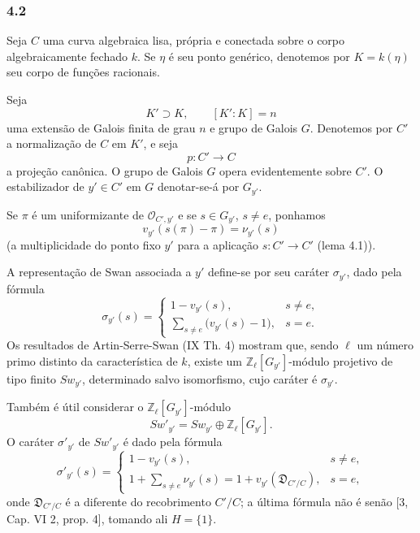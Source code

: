 \subsubsection*{4.2}

Seja $C$ uma curva algebraica lisa, própria e conectada sobre o corpo algebraicamente fechado $k$. Se $\eta$ é seu ponto genérico, denotemos por $K=k(\eta)$ seu corpo de funções racionais.

Seja
\[
K'\supset K,\qquad [K':K]=n
\]
uma extensão de Galois finita de grau $n$ e grupo de Galois $G$. Denotemos por $C'$ a normalização de $C$ em $K'$, e seja
\[
p:C'\longrightarrow C
\]
a projeção canônica. O grupo de Galois $G$ opera evidentemente sobre $C'$. O estabilizador de $y'\in C'$ em $G$ denotar-se-á por $G_{y'}$.

Se $\pi$ é um uniformizante de $\mathcal O_{C',y'}$ e se $s\in G_{y'}$, $s\ne e$, ponhamos
\[
v_{y'}(s(\pi)-\pi)=\nu_{y'}(s)
\tag{4.2.1}
\]
(a multiplicidade do ponto fixo $y'$ para a aplicação $s:C'\to C'$ (lema 4.1)).%

A representação de Swan associada a $y'$ define-se por seu caráter $\sigma_{y'}$, dado pela fórmula
\[
\sigma_{y'}(s)=
\begin{cases}
1-v_{y'}(s),& s\ne e,\\[0.4em]
\displaystyle\sum_{s\ne e}\bigl(v_{y'}(s)-1\bigr),& s=e.
\end{cases}
\tag{4.2.2}
\]
Os resultados de Artin-Serre-Swan (IX Th. 4) mostram que, sendo $\ell$ um número primo distinto da característica de $k$, existe um $\mathbb Z_\ell[G_{y'}]$-módulo projetivo de tipo finito $Sw_{y'}$, determinado salvo isomorfismo, cujo caráter é $\sigma_{y'}$.

Também é útil considerar o $\mathbb Z_\ell[G_{y'}]$-módulo
\[
Sw'_{y'}=Sw_{y'}\oplus\mathbb Z_\ell[G_{y'}].
\tag{4.2.3}
\]
O caráter $\sigma'_{y'}$ de $Sw'_{y'}$ é dado pela fórmula
\[
\sigma'_{y'}(s)=
\begin{cases}
1-v_{y'}(s),& s\ne e,\\[0.4em]
\displaystyle 1+\sum_{s\ne e}\nu_{y'}(s)
=1+v_{y'}(\mathfrak D_{C'/C}),& s=e,
\end{cases}
\tag{4.2.4}
\]
onde $\mathfrak D_{C'/C}$ é a diferente do recobrimento $C'/C$; a última fórmula não é senão [3, Cap. VI 2, prop. 4], tomando ali $H=\{1\}$.

